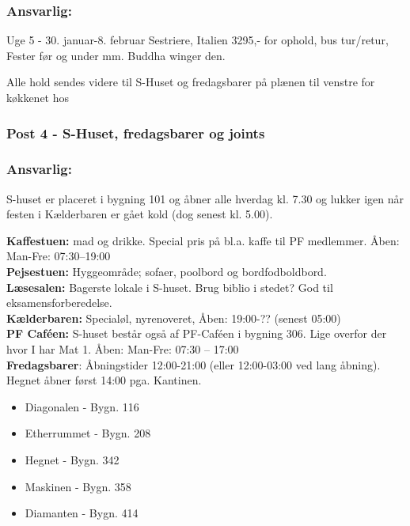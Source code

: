 \subsubsection*{\textbf{Ansvarlig:} \Buddha}
Uge 5 - 30. januar-8. februar
Sestriere, Italien
3295,- for ophold, bus tur/retur, Fester før og under mm. 
Buddha winger den.

Alle hold sendes videre til S-Huset og fredagsbarer på plænen til venstre for køkkenet hos \Hemorides

\subsubsection*{\textbf{Post 4 - S-Huset, fredagsbarer og joints}}
\subsubsection*{\textbf{Ansvarlig:} \Hemorides}
S-huset er placeret i bygning 101 og åbner alle hverdag kl. 7.30 og lukker igen når festen i Kælderbaren er gået kold (dog senest kl. 5.00).

\textbf{Kaffestuen:} mad og drikke. Special pris på bl.a. kaffe til PF medlemmer. Åben: Man-Fre: 07:30–19:00\\
\textbf{Pejsestuen:} Hyggeområde; sofaer, poolbord og bordfodboldbord.\\
\textbf{Læsesalen:} Bagerste lokale i S-huset. Brug biblio i stedet? God til eksamensforberedelse.\\
\textbf{Kælderbaren:} Specialøl, nyrenoveret,  Åben: 19:00-?? (senest 05:00)\\

\textbf{PF Caféen:} S-huset består også af PF-Caféen i bygning 306. Lige overfor der hvor I har Mat 1. Åben: Man-Fre: 07:30 – 17:00\\


\textbf{Fredagsbarer}: Åbningstider 12:00-21:00 (eller 12:00-03:00 ved lang åbning). Hegnet åbner først 14:00 pga. Kantinen.
\begin{itemize}
  \item Diagonalen - Bygn. 116
  \item Etherrummet - Bygn. 208
  \item Hegnet - Bygn. 342
  \item Maskinen - Bygn. 358
  \item Diamanten - Bygn. 414
\end{itemize}

